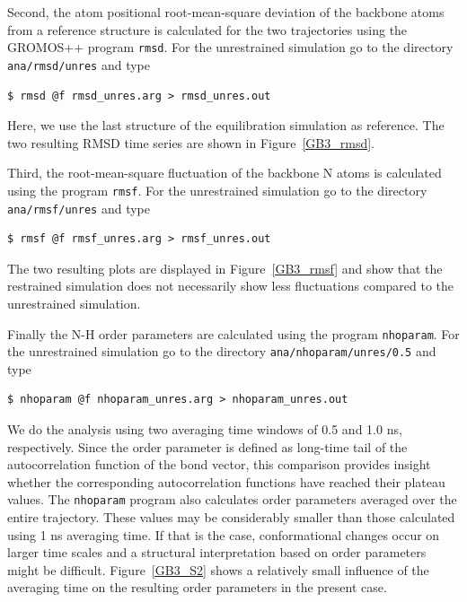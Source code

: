 Second, the atom positional root-mean-square deviation of the backbone atoms from a reference structure is calculated for the two trajectories using the GROMOS++ program \texttt{rmsd}. 
For the unrestrained simulation go to the directory \texttt{ana/rmsd/unres} and type
\begin{lstlisting}
$ rmsd @f rmsd_unres.arg > rmsd_unres.out
\end{lstlisting}
Here, we use the last structure of the equilibration simulation as reference. The two resulting RMSD time series are shown in Figure~\ref{GB3_rmsd}. 

Third, the root-mean-square fluctuation of the backbone N atoms is calculated using the program \texttt{rmsf}. For the unrestrained simulation go to the directory \texttt{ana/rmsf/unres} and type
\begin{lstlisting}
$ rmsf @f rmsf_unres.arg > rmsf_unres.out
\end{lstlisting}
The two resulting plots are displayed in Figure~\ref{GB3_rmsf} and show that the restrained simulation does not necessarily show less fluctuations compared to the unrestrained simulation.

Finally the N-H order parameters are calculated using the program \texttt{nhoparam}. For the unrestrained simulation go to the directory \texttt{ana/nhoparam/unres/0.5} and type
\begin{lstlisting}
$ nhoparam @f nhoparam_unres.arg > nhoparam_unres.out
\end{lstlisting}
We do the analysis using two averaging time windows of 0.5 and 1.0 ns, respectively. Since the order parameter is defined as long-time tail of the autocorrelation function of the bond vector, this comparison provides 
insight whether the corresponding autocorrelation functions have reached their plateau values. The \texttt{nhoparam} program also calculates order parameters averaged over the entire trajectory. These values 
may be considerably smaller than those calculated using 1 ns averaging time. If that is the case, conformational changes occur on larger time scales and a structural interpretation based on order parameters might be difficult.
Figure~\ref{GB3_S2} shows a relatively small influence of the averaging time on the resulting order parameters in the present case. 

